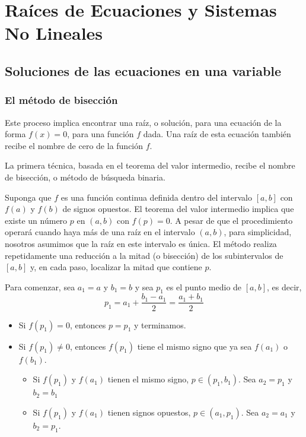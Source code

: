 \chapter{Raíces de Ecuaciones y Sistemas No Lineales}
\section{Soluciones de las ecuaciones en una variable}
\subsection{El método de bisección}
Este proceso implica encontrar una raíz, o solución, para una ecuación de la forma $f(x) = 0$, para una función $f$ dada. Una raíz de esta ecuación también recibe el nombre de cero de la función $f$.

La primera técnica, basada en el teorema del valor intermedio, recibe el nombre de bisección, o método de búsqueda binaria.

Suponga que $f$ es una función continua definida dentro del intervalo $[a, b]$ con $f(a)$ y $f(b)$ de signos opuestos. El teorema del valor intermedio implica que existe un número $p$ en $(a, b)$ con $f(p) = 0$. A pesar de que el procedimiento operará cuando haya más de una raíz en el intervalo $(a, b)$, para simplicidad, nosotros asumimos que la raíz en este intervalo es única. El método realiza repetidamente una reducción a la mitad (o bisección) de los subintervalos de $[a, b]$ y, en cada paso, localizar la mitad que contiene $p$.

Para comenzar, sea $a_1 = a$ y $b_1 = b$ y sea $p_1$ es el punto medio de $[a, b]$, es decir,
\[p_1 = a_1 + \frac{b_1 - a_1}{2} = \frac{a_1 + b_1}{2}\]

\begin{itemize}
    \item Si $f(p_1) = 0$, entonces $p = p_1$ y terminamos.
    \item Si $f(p_1) \neq 0$, entonces $f(p_1)$ tiene el mismo signo que ya sea $f(a_1)$ o $f(b_1)$.
    \begin{itemize}
        \item Si $f(p_1)$ y $f(a_1)$ tienen el mismo signo, $p \in (p_1, b_1)$. Sea $a_2 = p_1$ y $b_2 = b_1$
        \item Si $f(p_1)$ y $f(a_1)$ tienen signos opuestos, $p \in (a_1, p_1)$. Sea $a_2 = a_1$ y $b_2 = p_1$.
    \end{itemize}
\end{itemize}

